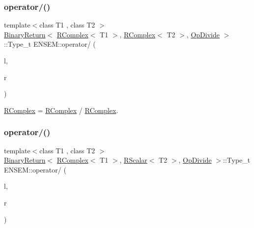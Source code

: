 \subsubsection{\texorpdfstring{operator/()}{operator/()}\hspace{0.1cm}{\footnotesize\ttfamily [1/3]}}
{\footnotesize\ttfamily template$<$class T1 , class T2 $>$ \\
\mbox{\hyperlink{structENSEM_1_1BinaryReturn}{Binary\+Return}}$<$ \mbox{\hyperlink{classENSEM_1_1RComplex}{R\+Complex}}$<$ T1 $>$, \mbox{\hyperlink{classENSEM_1_1RComplex}{R\+Complex}}$<$ T2 $>$, \mbox{\hyperlink{structENSEM_1_1OpDivide}{Op\+Divide}} $>$\+::Type\+\_\+t E\+N\+S\+E\+M\+::operator/ (\begin{DoxyParamCaption}\item[{const \mbox{\hyperlink{classENSEM_1_1RComplex}{R\+Complex}}$<$ T1 $>$ \&}]{l,  }\item[{const \mbox{\hyperlink{classENSEM_1_1RComplex}{R\+Complex}}$<$ T2 $>$ \&}]{r }\end{DoxyParamCaption})\hspace{0.3cm}{\ttfamily [inline]}}



\mbox{\hyperlink{classENSEM_1_1RComplex}{R\+Complex}} = \mbox{\hyperlink{classENSEM_1_1RComplex}{R\+Complex}} / \mbox{\hyperlink{classENSEM_1_1RComplex}{R\+Complex}}. 

\mbox{\label{group__rcomplex_ga249a0c4eb26560012c5090b615fadf26}} 
\subsubsection{\texorpdfstring{operator/()}{operator/()}\hspace{0.1cm}{\footnotesize\ttfamily [2/3]}}
{\footnotesize\ttfamily template$<$class T1 , class T2 $>$ \\
\mbox{\hyperlink{structENSEM_1_1BinaryReturn}{Binary\+Return}}$<$ \mbox{\hyperlink{classENSEM_1_1RComplex}{R\+Complex}}$<$ T1 $>$, \mbox{\hyperlink{classENSEM_1_1RScalar}{R\+Scalar}}$<$ T2 $>$, \mbox{\hyperlink{structENSEM_1_1OpDivide}{Op\+Divide}} $>$\+::Type\+\_\+t E\+N\+S\+E\+M\+::operator/ (\begin{DoxyParamCaption}\item[{const \mbox{\hyperlink{classENSEM_1_1RComplex}{R\+Complex}}$<$ T1 $>$ \&}]{l,  }\item[{const \mbox{\hyperlink{classENSEM_1_1RScalar}{R\+Scalar}}$<$ T2 $>$ \&}]{r }\end{DoxyParamCaption})\hspace{0.3cm}{\ttfamily [inline]}}



